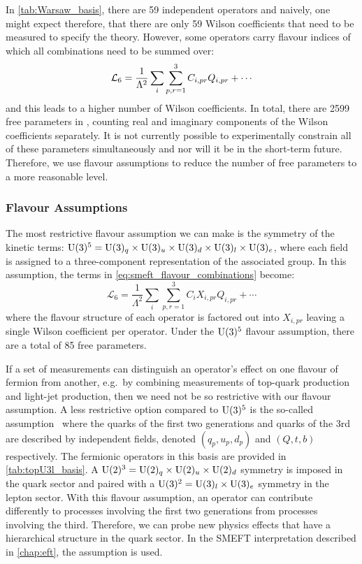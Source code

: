 

In \cref{tab:Warsaw_basis}, there are 59 independent operators and naively, one might expect therefore, that there are only 59 Wilson coefficients that need to be measured to specify the theory. However, some operators carry flavour indices of which all combinations need to be summed over:
\begin{equation}
  \Lsix = \frac{1}{\Lambda^2} \sum_i \sum^3_{p,r=1} C_{i,pr} Q_{i,pr} + \cdots
  \label{eq:smeft_flavour_combinations}
\end{equation}
and this leads to a higher number of Wilson coefficients. In total, there are 2599 free parameters in \Lsix, counting real and imaginary components of the Wilson coefficients separately. It is not currently possible to experimentally constrain all of these parameters simultaneously and nor will it be in the short-term future. Therefore, we use flavour assumptions to reduce the number of free parameters to a more reasonable level.

\subsubsection{Flavour Assumptions}
The most restrictive flavour assumption we can make is the symmetry of the kinetic terms: $\mathrm{U}(3)^5 = \mathrm{U}(3)_q \times \mathrm{U}(3)_u \times \mathrm{U}(3)_d \times \mathrm{U}(3)_l \times\mathrm{U}(3)_e$, where each field is assigned to a three-component representation of the associated group. In this assumption, the terms in \cref{eq:smeft_flavour_combinations} become:
\begin{equation}
  \mathcal{L}_6 = \frac{1}{\Lambda^2} \sum_i \sum^3_{p,r=1} C_i X_{i,pr} Q_{i,pr} + \cdots
  \label{eq:smeft_flavour_combinations_u35}
\end{equation}
where the flavour structure of each operator is factored out into $X_{i,pr}$ leaving a single Wilson coefficient per operator. Under the $\mathrm{U}(3)^5$ flavour assumption, there are a total of 85 free parameters.

If a set of measurements can distinguish an operator's effect on one flavour of fermion from another, e.g.\ by combining measurements of top-quark production and light-jet production, then we need not be so restrictive with our flavour assumption. A less restrictive option compared to $\mathrm{U}(3)^5$ is the so-called \topUtl assumption~\cite{Brivio:2020onw} where the quarks of the first two generations and quarks of the 3rd are described by independent fields, denoted $(q_p, u_p, d_p)$ and $(Q, t, b)$ respectively. The fermionic operators in this basis are provided in \cref{tab:topU3l_basis}. A $\mathrm{U}(2)^3 = \mathrm{U}(2)_q \times \mathrm{U}(2)_u \times \mathrm{U}(2)_d$ symmetry is imposed in the quark sector and paired with a $\mathrm{U}(3)^2 = \mathrm{U}(3)_l \times \mathrm{U}(3)_e$ symmetry in the lepton sector. With this flavour assumption, an operator can contribute differently to processes involving the first two generations from processes involving the third. Therefore, we can probe new physics effects that have a hierarchical structure in the quark sector. In the SMEFT interpretation described in \cref{chap:eft}, the \topUtl assumption is used.

